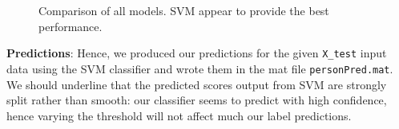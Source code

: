 \documentclass[10pt,a4paper]{article}
\begin{document}
   \begin{figure}[ht]
       \center
    	\hfill
	\caption{Comparison of all models. SVM appear to provide the best performance.}
  \end{figure}

  \textbf{Predictions}: Hence, we produced our predictions for the given \texttt{X\_test} input data using the SVM classifier and wrote them in the mat file \texttt{personPred.mat}. We should underline that the predicted scores output from SVM are strongly split rather than smooth: our classifier seems to predict with high confidence, hence varying the threshold will not affect much our label predictions.
\end{document}
